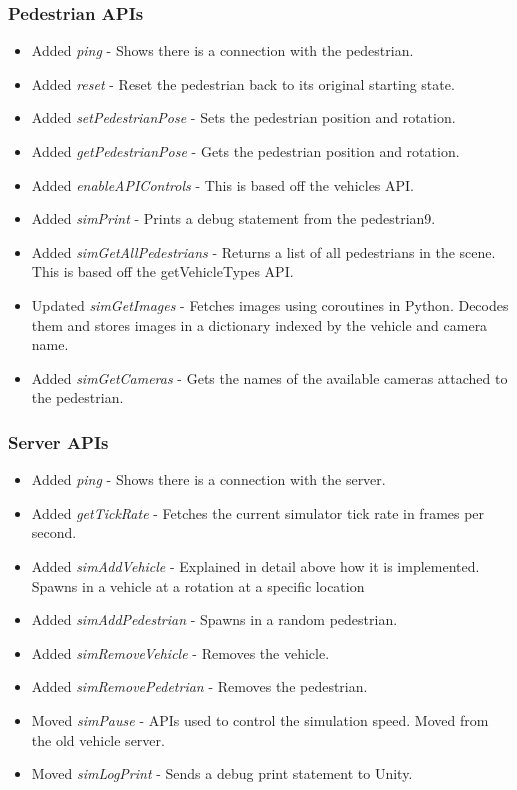\subsubsection{Pedestrian APIs}
\begin{itemize}
    \item Added \emph{ping} - Shows there is a connection with the pedestrian.
    \item Added \emph{reset} - Reset the pedestrian back to its original starting state.
    \item Added \emph{setPedestrianPose} - Sets the pedestrian position and rotation.
    \item Added \emph{getPedestrianPose} - Gets the pedestrian position and rotation.
    \item Added \emph{enableAPIControls} - This is based off the vehicles API. 
    \item Added \emph{simPrint} - Prints a debug statement from the pedestrian9.
    \item Added \emph{simGetAllPedestrians} - Returns a list of all pedestrians in the scene. This is based off the getVehicleTypes API. 
    \item Updated \emph{simGetImages} - Fetches images using coroutines in Python. Decodes them and stores images in a dictionary indexed by the vehicle and camera name.
    \item Added \emph{simGetCameras} - Gets the names of the available cameras attached to the pedestrian. 
\end{itemize}


\subsubsection{Server APIs}
\begin{itemize}
    \item Added \emph{ping} - Shows there is a connection with the server.
    \item Added \emph{getTickRate} - Fetches the current simulator tick rate in frames per second.
    \item Added \emph{simAddVehicle} - Explained in detail above how it is implemented. Spawns in a vehicle at a rotation at a specific location
    \item Added \emph{simAddPedestrian} - Spawns in a random pedestrian.
    \item Added \emph{simRemoveVehicle} - Removes the vehicle.    
    \item Added \emph{simRemovePedetrian} - Removes the pedestrian.
    \item Moved \emph{simPause} - APIs used to control the simulation speed. Moved from the old vehicle server.
    \item Moved \emph{simLogPrint} - Sends a debug print statement to Unity. 
\end{itemize}


